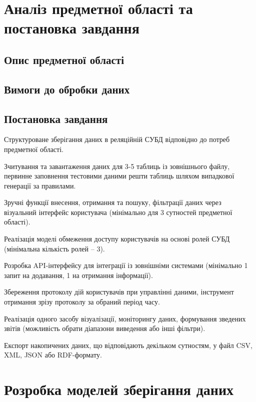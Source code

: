 \documentclass[oneside,14pt]{extarticle}
\begin{document}
\section{Аналіз предметної області та постановка завдання}
\subsection{Опис предметної області}
\subsection{Вимоги до обробки даних}

\subsection{Постановка завдання}
\begin{list}{•}{Функції інформаційної системи:}
    \item Структуроване зберігання даних в реляційній СУБД відповідно до потреб предметної області.
    \item Зчитування та завантаження даних для 3-5 таблиць із зовнішнього файлу, первинне заповнення тестовими даними решти таблиць шляхом випадкової генерації за правилами.
    \item Зручні функції внесення, отримання та пошуку, фільтрації даних через візуальний інтерфейс користувача (мінімально для 3 сутностей предметної області).
    \item Реалізація моделі обмеження доступу користувачів на основі ролей СУБД (мінімальна кількість ролей – 3).
    \item Розробка API-інтерфейсу для інтеграції із зовнішніми системами (мінімально 1 запит на додавання, 1 на отримання інформації).
    \item Збереження протоколу дій користувачів при управлінні даними, інструмент отримання зрізу протоколу за обраний період часу.
    \item Реалізація одного засобу візуалізації, моніторингу даних, формування зведених звітів (можливість обрати діапазони виведення або інші фільтри).
    \item Експорт накопичених даних, що відповідають декільком сутностям, у файл CSV, XML, JSON або RDF-формату.
\end{list}
\newpage

\section{Розробка моделей зберігання даних}
\end{document}
